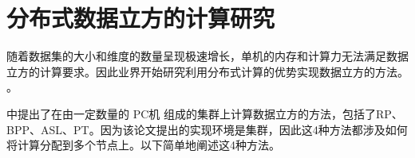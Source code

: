 


\section{分布式数据立方的计算研究}

随着数据集的大小和维度的数量呈现极速增长，单机的内存和计算力无法满足数据立方的计算要求。因此业界开始研究利用分布式计算的优势实现数据立方的方法。\cite{nandi2011distributed} \cite{dehne2006cgmcube} \cite{ng2001iceberg} \cite{lee2012efficient}。

\cite{ng2001iceberg} 中提出了在由一定数量的 PC机 组成的集群上计算数据立方的方法，包括了RP、BPP、ASL、PT。因为该论文提出的实现环境是集群，因此这4种方法都涉及如何将计算分配到多个节点上。以下简单地阐述这4种方法。

